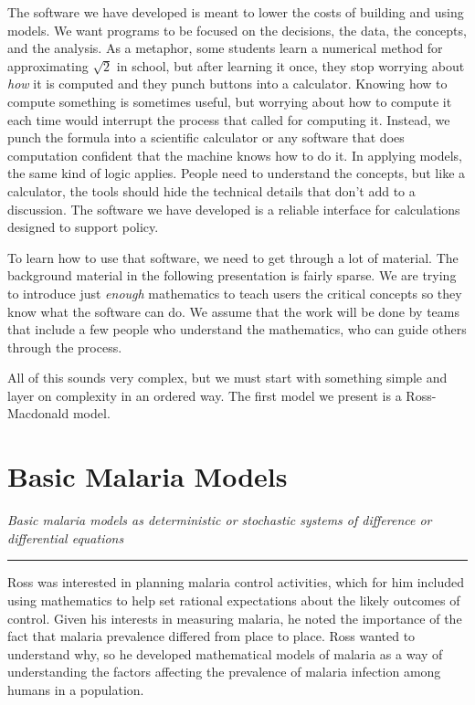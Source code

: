\documentclass[
]{book}
\begin{document}
The software we have developed is meant to lower the costs of building and using models. We want programs to be focused on the decisions, the data, the concepts, and the analysis. As a metaphor, some students learn a numerical method for approximating \(\sqrt{2}\) in school, but after learning it once, they stop worrying about \emph{how} it is computed and they punch buttons into a calculator. Knowing how to compute something is sometimes useful, but worrying about how to compute it each time would interrupt the process that called for computing it. Instead, we punch the formula into a scientific calculator or any software that does computation confident that the machine knows how to do it. In applying models, the same kind of logic applies. People need to understand the concepts, but like a calculator, the tools should hide the technical details that don't add to a discussion. The software we have developed is a reliable interface for calculations designed to support policy.

To learn how to use that software, we need to get through a lot of material. The background material in the following presentation is fairly sparse. We are trying to introduce just \emph{enough} mathematics to teach users the critical concepts so they know what the software can do. We assume that the work will be done by teams that include a few people who understand the mathematics, who can guide others through the process.

All of this sounds very complex, but we must start with something simple and layer on complexity in an ordered way. The first model we present is a Ross-Macdonald model.

\chapter{Basic Malaria Models}\label{basic-malaria-models}

\emph{Basic malaria models as deterministic or stochastic systems of difference or differential equations}

\begin{center}\rule{0.5\linewidth}{0.5pt}\end{center}

Ross was interested in planning malaria control activities, which for him included using mathematics to help set rational expectations about the likely outcomes of control.
Given his interests in measuring malaria, he noted the importance of the fact that malaria prevalence differed from place to place.
Ross wanted to understand why, so he developed mathematical models of malaria as a way of understanding the factors affecting the prevalence of malaria infection among humans in a population.
\end{document}
